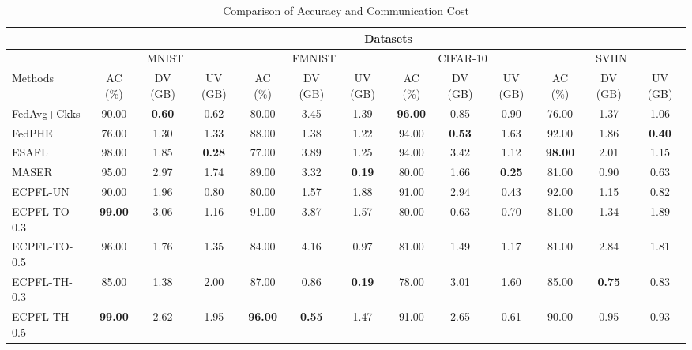 
\begin{table}[t]
\centering
\caption{Comparison of Accuracy and Communication Cost}
\label{tab:comm-comparison}
\footnotesize

\begin{tabular}{|l|c|c|c|c|c|c|c|c|c|c|c|c|}
\hline
 & \multicolumn{12}{c|}{Datasets} \\
\hline
 & \multicolumn{3}{c|}{MNIST} & \multicolumn{3}{c|}{FMNIST} & \multicolumn{3}{c|}{CIFAR-10} & \multicolumn{3}{c|}{SVHN} \\
\hline
Methods & AC (\%) & DV (GB) & UV (GB) & AC (\%) & DV (GB) & UV (GB) & AC (\%) & DV (GB) & UV (GB) & AC (\%) & DV (GB) & UV (GB) \\
\hline
FedAvg+Ckks & 90.00 & \textbf{0.60} & 0.62 & 80.00 & 3.45 & 1.39 & \textbf{96.00} & 0.85 & 0.90 & 76.00 & 1.37 & 1.06 \\
\hline
FedPHE & 76.00 & 1.30 & 1.33 & 88.00 & 1.38 & 1.22 & 94.00 & \textbf{0.53} & 1.63 & 92.00 & 1.86 & \textbf{0.40} \\
\hline
ESAFL & 98.00 & 1.85 & \textbf{0.28} & 77.00 & 3.89 & 1.25 & 94.00 & 3.42 & 1.12 & \textbf{98.00} & 2.01 & 1.15 \\
\hline
MASER & 95.00 & 2.97 & 1.74 & 89.00 & 3.32 & \textbf{0.19} & 80.00 & 1.66 & \textbf{0.25} & 81.00 & 0.90 & 0.63 \\
\hline
ECPFL-UN & 90.00 & 1.96 & 0.80 & 80.00 & 1.57 & 1.88 & 91.00 & 2.94 & 0.43 & 92.00 & 1.15 & 0.82 \\
\hline
ECPFL-TO-0.3 & \textbf{99.00} & 3.06 & 1.16 & 91.00 & 3.87 & 1.57 & 80.00 & 0.63 & 0.70 & 81.00 & 1.34 & 1.89 \\
\hline
ECPFL-TO-0.5 & 96.00 & 1.76 & 1.35 & 84.00 & 4.16 & 0.97 & 81.00 & 1.49 & 1.17 & 81.00 & 2.84 & 1.81 \\
\hline
ECPFL-TH-0.3 & 85.00 & 1.38 & 2.00 & 87.00 & 0.86 & \textbf{0.19} & 78.00 & 3.01 & 1.60 & 85.00 & \textbf{0.75} & 0.83 \\
\hline
ECPFL-TH-0.5 & \textbf{99.00} & 2.62 & 1.95 & \textbf{96.00} & \textbf{0.55} & 1.47 & 91.00 & 2.65 & 0.61 & 90.00 & 0.95 & 0.93 \\
\hline
\end{tabular}
\end{table}